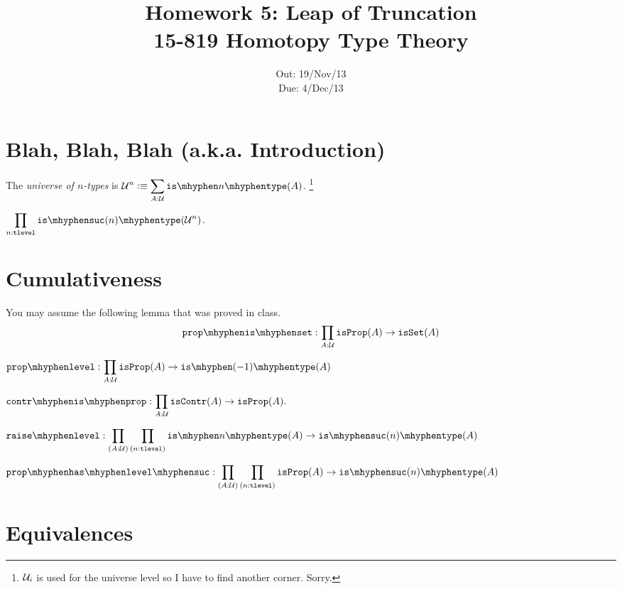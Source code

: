 \documentclass[12pt]{article}
\title{\Large\textbf{
  Homework 5: Leap of Truncation}
\normalsize\\
15-819 Homotopy Type Theory}
\author{}
\date{%
Out: 19/Nov/13\\
Due: 4/Dec/13
}
\begin{document}
\maketitle

\section{Blah, Blah, Blah (a.k.a. Introduction)}

\begin{definition}
  The
  \emph{universe of $n$-types}
  is
  $\displaystyle \U^n \defeq \sum_{A:\U} \istype{n}(A)$.%
  \footnote{$\mathcal{U}_i$ is used for the universe level so I have to find another corner. Sorry.}
\end{definition}

\begin{theorem}
  $\displaystyle \prod_{n:\tlevel} \istype{\suc(n)}(\U^n)$.
\end{theorem}

\section{Cumulativeness}

You may assume the following lemma that was proved in class.
\[
  \displaystyle \propisset : \prod_{A:\U} \isprop(A) \to \isset(A)
\]

\begin{task}
  $\displaystyle
    \proplevel : \prod_{A : \U} \isprop(A) \to \istype{(-1)}(A)
  $
\end{task}

\begin{task}
  $\displaystyle
    \contrisprop : \prod_{A : \U} \iscontr(A) \to \isprop(A).
  $
\end{task}

\begin{task}
  $\displaystyle
    \raiselevel :
    \prod_{(A:\U)}
    \prod_{(n:\tlevel)}
    \istype{n}(A) \to \istype{\suc(n)}(A)
  $
\end{task}

\begin{task}
  $\displaystyle
    \prophaslevelsuc :
    \prod_{(A:\U)}
    \prod_{(n:\tlevel)}
    \isprop(A) \to \istype{\suc(n)}(A)
  $
\end{task}

\section{Equivalences}
\end{document}
